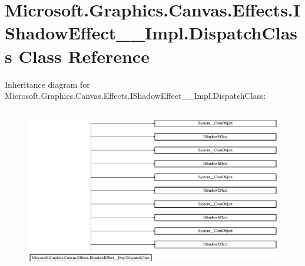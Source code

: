 \hypertarget{class_microsoft_1_1_graphics_1_1_canvas_1_1_effects_1_1_i_shadow_effect_____impl_1_1_dispatch_class}{}\section{Microsoft.\+Graphics.\+Canvas.\+Effects.\+I\+Shadow\+Effect\+\_\+\+\_\+\+Impl.\+Dispatch\+Class Class Reference}
\label{class_microsoft_1_1_graphics_1_1_canvas_1_1_effects_1_1_i_shadow_effect_____impl_1_1_dispatch_class}
Inheritance diagram for Microsoft.\+Graphics.\+Canvas.\+Effects.\+I\+Shadow\+Effect\+\_\+\+\_\+\+Impl.\+Dispatch\+Class\+:\begin{figure}[H]
\begin{center}
\leavevmode
\includegraphics[height=7.281324cm]{class_microsoft_1_1_graphics_1_1_canvas_1_1_effects_1_1_i_shadow_effect_____impl_1_1_dispatch_class}
\end{center}
\end{figure}
